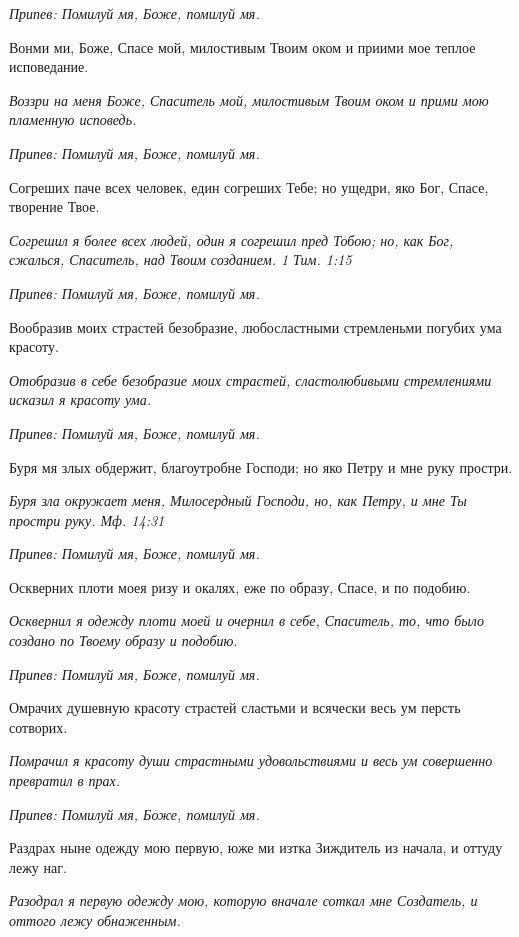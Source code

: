\itshape Припев:\normalfont{} Помилуй мя, Боже, помилуй мя.


Вонми ми, Боже, Спасе мой, милостивым Твоим оком и приими мое теплое исповедание.


\itshape Воззри на меня Боже, Спаситель мой, милостивым Твоим оком и прими мою пламенную исповедь.\normalfont{}


\itshape Припев:\normalfont{} Помилуй мя, Боже, помилуй мя.


Согреших паче всех человек, един согреших Тебе; но ущедри, яко Бог, Спасе, творение Твое.


\itshape Согрешил я более всех людей, один я согрешил пред Тобою; но, как Бог, сжалься, Спаситель, над Твоим созданием. 1 Тим. 1:15\normalfont{}


\itshape Припев:\normalfont{} Помилуй мя, Боже, помилуй мя.


Вообразив моих страстей безобразие, любосластными стремленьми погубих ума красоту.


\itshape Отобразив в себе безобразие моих страстей, сластолюбивыми стремлениями исказил я красоту ума.\normalfont{}


\itshape Припев:\normalfont{} Помилуй мя, Боже, помилуй мя.


Буря мя злых обдержит, благоутробне Господи; но яко Петру и мне руку простри.


\itshape Буря зла окружает меня, Милосердный Господи, но, как Петру, и мне Ты простри руку. Мф. 14:31\normalfont{}


\itshape Припев:\normalfont{} Помилуй мя, Боже, помилуй мя.


Оскверних плоти моея ризу и окалях, еже по образу, Спасе, и по подобию.


\itshape Осквернил я одежду плоти моей и очернил в себе, Спаситель, то, что было создано по Твоему образу и подобию.\normalfont{}


\itshape Припев:\normalfont{} Помилуй мя, Боже, помилуй мя.


Омрачих душевную красоту страстей сластьми и всячески весь ум персть сотворих.


\itshape Помрачил я красоту души страстными удовольствиями и весь ум совершенно превратил в прах.\normalfont{}


\itshape Припев:\normalfont{} Помилуй мя, Боже, помилуй мя.


Раздрах ныне одежду мою первую, юже ми изтка Зиждитель из начала, и оттуду лежу наг.


\itshape Разодрал я первую одежду мою, которую вначале соткал мне Создатель, и оттого лежу обнаженным.\normalfont{}



